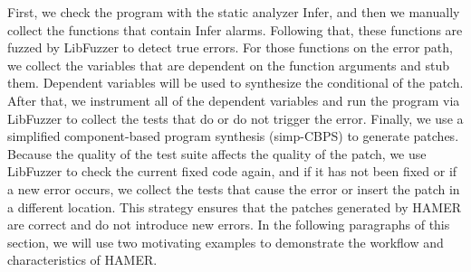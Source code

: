 \documentclass[a4paper,11pt,oneside,openany]{book}
\begin{document}
First, we check the program with the static analyzer \mbox{Infer}, and then we manually collect the functions that contain Infer alarms. Following that, these functions are fuzzed by LibFuzzer to detect true errors.  For those functions on the error path, we collect the variables that are dependent on the function arguments and stub them. Dependent variables will be used to synthesize the conditional of the patch. After that, we instrument all of the dependent variables and run the program via LibFuzzer to collect the tests that do or do not trigger the error. Finally, we use a simplified component-based program synthesis (simp-CBPS) to generate patches. Because the quality of the test suite affects the quality of the patch, we use LibFuzzer to check the current fixed code again, and if it has not been fixed or if a new error occurs, we collect the tests that cause the error or insert the patch in a different location. This strategy ensures that the patches generated by HAMER are correct and do not introduce new errors. In the following paragraphs of this section, we will use two motivating examples to demonstrate the workflow and characteristics of HAMER.
\end{document}
